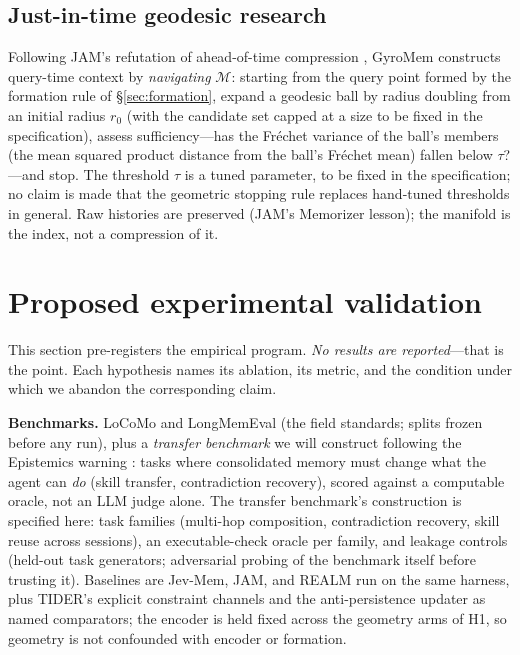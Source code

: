 \documentclass[11pt,a4paper]{article}
\newcommand{\M}{\mathcal{M}}
\begin{document}
\subsection{Just-in-time geodesic research}

Following JAM's refutation of ahead-of-time compression \cite{jam},
GyroMem constructs query-time context by \emph{navigating} $\M$: starting
from the query point formed by the formation rule of
\S\ref{sec:formation}, expand a geodesic ball by radius doubling from an
initial radius $r_0$ (with the candidate set capped at a size to be fixed
in the specification), assess sufficiency---has the Fr\'echet variance of
the ball's members (the mean squared product distance from the ball's
Fr\'echet mean) fallen below $\tau$?---and stop. The threshold $\tau$ is a
tuned parameter, to be fixed in the specification; no claim is made that the
geometric stopping rule replaces hand-tuned thresholds in general. Raw histories
are preserved (JAM's Memorizer lesson); the manifold is the index, not a
compression of it.

\section{Proposed experimental validation}
\label{sec:experiments}

This section pre-registers the empirical program. \emph{No results are
reported}---that is the point. Each hypothesis names its ablation, its
metric, and the condition under which we abandon the corresponding claim.

\textbf{Benchmarks.} LoCoMo and LongMemEval (the field standards; splits
frozen before any run), plus a \emph{transfer benchmark} we will construct
following the Epistemics warning \cite{epistemics}: tasks where
consolidated memory must change what the agent can \emph{do} (skill
transfer, contradiction recovery), scored against a computable oracle,
not an LLM judge alone. The transfer benchmark's construction is specified
here: task families (multi-hop composition, contradiction recovery, skill
reuse across sessions), an executable-check oracle per family, and leakage
controls (held-out task generators; adversarial probing of the benchmark
itself before trusting it). Baselines are Jev-Mem, JAM, and REALM run on
the same harness, plus TIDER's explicit constraint channels
\cite{tider} and the anti-persistence updater \cite{antipersistence} as
named comparators; the encoder is held fixed across the geometry arms of
H1, so geometry is not confounded with encoder or formation.
\end{document}
